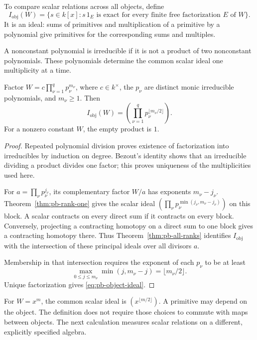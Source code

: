To compare scalar relations across all objects, define
\[
 I_{\mathrm{obj}}(W)
 =\{s\in k[x]:s\,1_E\text{ is exact for every finite free
 factorization }E\text{ of }W\}.
\]
It is an ideal: sums of primitives and multiplication of a primitive
by a polynomial give primitives for the corresponding sums and
multiples.

A nonconstant polynomial is irreducible if it is not a product of
two nonconstant polynomials. These polynomials determine the common
scalar ideal one multiplicity at a time.

\begin{theorem}
\label{thm:pb-object-ideal}
Factor \(W=c\prod_{\nu=1}^q p_\nu^{m_\nu}\), where \(c\in k^\times\),
the \(p_\nu\) are distinct monic irreducible polynomials, and
\(m_\nu\geq1\). Then
\begin{equation}
 I_{\mathrm{obj}}(W)
   =\left(\prod_{\nu=1}^q
                 p_\nu^{\lfloor m_\nu/2\rfloor}\right).
 \label{eq:pb-object-ideal}
\end{equation}
For a nonzero constant \(W\), the empty product is \(1\).
\end{theorem}
\begin{proof}
Repeated polynomial division proves existence of factorization into
irreducibles by induction on degree. Bezout's identity shows that
an irreducible dividing a product divides one factor; this proves
uniqueness of the multiplicities used here.

For \(a=\prod_\nu p_\nu^{j_\nu}\), its complementary factor \(W/a\)
has exponents \(m_\nu-j_\nu\). Theorem~\ref{thm:pb-rank-one} gives
the scalar ideal
\((\prod_\nu p_\nu^{\min(j_\nu,m_\nu-j_\nu)})\) on this block.
A scalar contracts on every direct sum if it contracts on every
block. Conversely, projecting a contracting homotopy on a direct
sum to one block gives a contracting homotopy there. Thus
Theorem~\ref{thm:pb-all-ranks} identifies \(I_{\mathrm{obj}}\) with
the intersection of these principal ideals over all divisors \(a\).

Membership in that intersection requires the exponent of each
\(p_\nu\) to be at least
\[
 \max_{0\leq j\leq m_\nu}\min(j,m_\nu-j)
 =\lfloor m_\nu/2\rfloor .
\]
Unique factorization gives
\eqref{eq:pb-object-ideal}.
\end{proof}

For \(W=x^m\), the common scalar ideal is
\((x^{\lfloor m/2\rfloor})\). A primitive may depend on the
object. The definition does not require those choices to commute
with maps between objects. The next calculation measures scalar
relations on a different, explicitly specified algebra.

